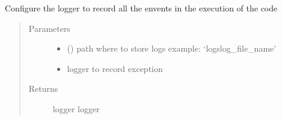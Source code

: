\documentclass[letterpaper,10pt,english]{sphinxmanual}
\begin{document}
\begin{fulllineitems}
\label{\detokenize{index:dummy_project_utils.set_up_logger}}
\sphinxAtStartPar
{}

\sphinxAtStartPar
Configure the logger to record all the envents in the execution of the code
\begin{quote}\begin{description}
\item[{Parameters}] \leavevmode\begin{itemize}
\item {} 
\sphinxAtStartPar
{} () \textendash{} path where to store logs example: ‘logslog\_file\_name’

\item {} 
\sphinxAtStartPar
{} \textendash{} logger to record exception

\end{itemize}

\item[{Returns}] \leavevmode
\sphinxAtStartPar
logger logger

\end{description}\end{quote}

\end{fulllineitems}



\renewcommand{\indexname}{Python Module Index}
\begin{sphinxtheindex}
\let\bigletter\sphinxstyleindexlettergroup
\bigletter{d}
\item\relax{}
\item\relax{}
\indexspace
\bigletter{m}
\item\relax{}
\indexspace
\bigletter{u}
\item\relax{}
\end{sphinxtheindex}

\renewcommand{\indexname}{Index}
\printindex
\end{document}

